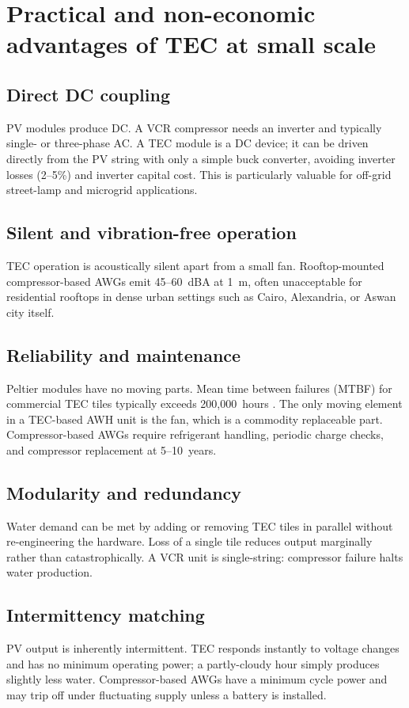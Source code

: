 \documentclass[11pt,a4paper]{article}
\begin{document}
\section{Practical and non-economic advantages of TEC at small scale}
\subsection{Direct DC coupling}
PV modules produce DC. A VCR compressor needs an inverter and typically single- or three-phase AC. A TEC module is a DC device; it can be driven directly from the PV string with only a simple buck converter, avoiding inverter losses (2--5\%) and inverter capital cost. This is particularly valuable for off-grid street-lamp and microgrid applications.

\subsection{Silent and vibration-free operation}
TEC operation is acoustically silent apart from a small fan. Rooftop-mounted compressor-based AWGs emit 45--60~dBA at 1~m, often unacceptable for residential rooftops in dense urban settings such as Cairo, Alexandria, or Aswan city itself.

\subsection{Reliability and maintenance}
Peltier modules have no moving parts. Mean time between failures (MTBF) for commercial TEC tiles typically exceeds 200{,}000~hours \cite{ieeeref_peltier_tec}. The only moving element in a TEC-based AWH unit is the fan, which is a commodity replaceable part. Compressor-based AWGs require refrigerant handling, periodic charge checks, and compressor replacement at 5--10~years.

\subsection{Modularity and redundancy}
Water demand can be met by adding or removing TEC tiles in parallel without re-engineering the hardware. Loss of a single tile reduces output marginally rather than catastrophically. A VCR unit is single-string: compressor failure halts water production.

\subsection{Intermittency matching}
PV output is inherently intermittent. TEC responds instantly to voltage changes and has no minimum operating power; a partly-cloudy hour simply produces slightly less water. Compressor-based AWGs have a minimum cycle power and may trip off under fluctuating supply unless a battery is installed.
\end{document}
